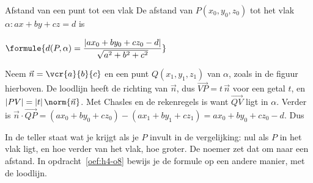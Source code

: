 \begin{theorie}
\begin{stelling}{Afstand van een punt tot een vlak}
De afstand van $P(x_0, y_0, z_0)$ tot het vlak $\alpha\colon ax + by + cz = d$ is

\vspace{1mm}
\qquad $\formule{d(P, \alpha) = \dfrac{|ax_0 + by_0 + cz_0 - d|}{\sqrt{a^2 + b^2 + c^2}}}$
\end{stelling}
\begin{bewijs}
Neem $\vec n = \vcr{a}{b}{c}$ en een punt $Q(x_1, y_1, z_1)$ van $\alpha$, zoals in de figuur hierboven. De loodlijn heeft de richting van $\vec n$, dus $\overrightarrow{VP} = t\,\vec n$ voor een getal $t$, en $|PV| = |t|\,\norm{\vec n}$. Met Chasles en de rekenregels is
want $\overrightarrow{QV}$ ligt in $\alpha$. Verder is $\vec n \cdot \overrightarrow{QP} = (ax_0 + by_0 + cz_0) - (ax_1 + by_1 + cz_1) = ax_0 + by_0 + cz_0 - d$. Dus
\end{bewijs}
\end{theorie}

In de teller staat wat je krijgt als je $P$ invult in de vergelijking: nul als $P$ in het vlak ligt, en hoe verder van het vlak, hoe groter. De noemer zet dat om naar een afstand. In opdracht~\ref{oef:h4-o8} bewijs je de formule op een andere manier, met de loodlijn.


\begin{oefeningen}

\end{oefeningen}

